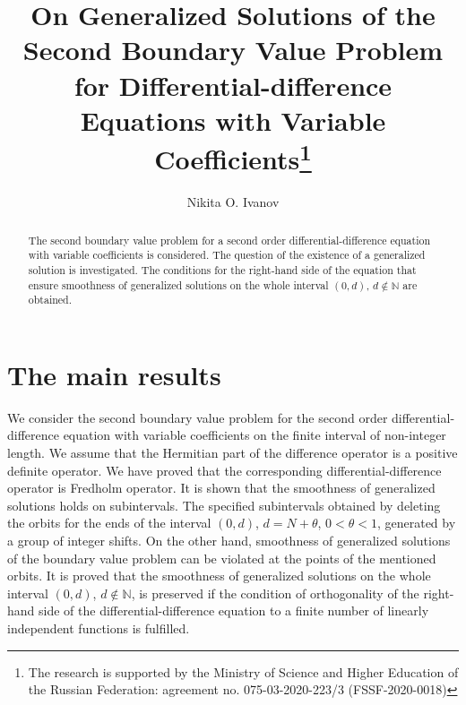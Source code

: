 \documentclass[12pt]{llncs}
\begin{document}
%

\fi 

\title{On Generalized Solutions of the Second Boundary Value Problem for Differential-difference Equations with Variable Coefficients\thanks{The research is supported by  the Ministry of Science and Higher Education of the Russian Federation: agreement no. 075-03-2020-223/3 (FSSF-2020-0018)}}
\author{Nikita O. Ivanov}


\maketitle

\begin{abstract}
The second boundary value problem for a second order differential-difference equation with variable coefficients is considered. The question of the existence of a generalized solution is investigated. The conditions for the right-hand side of the equation that ensure smoothness of generalized solutions on the whole interval $(0, d)$, $d \notin \mathbb{N}$ are obtained.

\end{abstract}

\section{The main results}

We consider the second boundary value problem for the second order differential-difference equation with variable coefficients on the finite interval of non-integer length. We assume that the Hermitian part of the difference operator is a positive definite operator. We have proved that the corresponding differential-difference operator is Fredholm operator. It is shown that the smoothness of generalized solutions holds on subintervals. The specified subintervals obtained by deleting the orbits for the ends of the interval $(0, d)$, $d =N+\theta$, $0<\theta<1$, generated by a group of integer shifts. On the other hand, smoothness of generalized solutions of the boundary value problem can be violated at the points of the mentioned orbits. It is proved that the smoothness of generalized solutions on the whole interval $(0, d)$, $d \notin \mathbb{N}$,  is preserved if the condition of orthogonality of the right-hand side of the differential-difference equation to a finite number of linearly independent functions is fulfilled.
\end{document}
